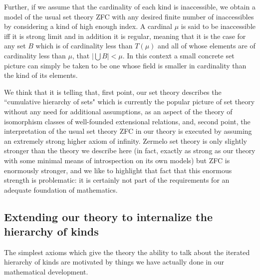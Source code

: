 \documentclass[12pt]{article}
\begin{document}
\begin{description}
Further, if we assume that the cardinality of each kind is inaccessible, we obtain a model of the usual set theory ZFC with any desired  finite number of inaccessibles by considering a kind of high enough index.  A cardinal $\mu$ is said to be inaccessible iff it is strong limit and in addition it is regular, meaning that it is the case for any set $B$ which is of cardinality less than $T(\mu)$ and all of whose elements are of cardinality less than $\mu$, that $|\bigcup B| < \mu$.  In this context a small concrete set picture can simply be taken to be one whose field is smaller in cardinality than the kind of its elements. 

We think that it is telling that, first point, our set theory describes the ``cumulative hierarchy of sets" which is currently the popular picture of set theory without any need for additional assumptions, as an aspect of the theory of isomorphism classes of well-founded extensional relations, and, second point, the interpretation of the usual set theory ZFC in our theory is executed by assuming an extremely strong higher axiom of infinity.  Zermelo set theory is only slightly stronger than the theory we describe here (in fact, exactly as strong as our theory with some minimal means of introspection on its own models) but ZFC is enormously stronger, and we like to highlight that fact that this enormous strength is problematic:  it is certainly not  part of the requirements for an adequate foundation of mathematics.

\end{description}

\newpage

\subsection{Extending our theory to internalize the hierarchy of kinds}

The simplest axioms which give the theory the ability to talk about the iterated hierarchy of kinds are motivated by things we have actually done in our mathematical development.
\end{document}
